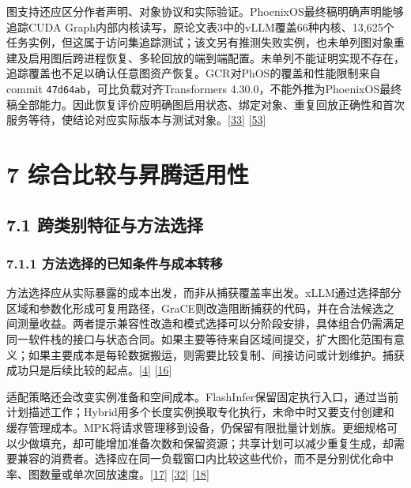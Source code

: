 \documentclass[
  11pt,
  UTF8]{ctexart}
\begin{document}
图支持还应区分作者声明、对象协议和实际验证。PhoenixOS最终稿明确声明能够追踪CUDA
Graph内部内核读写，原论文表3中的vLLM覆盖66种内核、13,625个任务实例，但这属于访问集追踪测试；该文另有推测失败实例，也未单列图对象重建及启用图后跨进程恢复、多轮回放的端到端配置。未单列不能证明实现不存在，追踪覆盖也不足以确认任意图资产恢复。GCR对PhOS的覆盖和性能限制来自commit
\texttt{47d64ab}，可比负载对齐Transformers
4.30.0，不能外推为PhoenixOS最终稿全部能力。因此恢复评价应明确图启用状态、绑定对象、重复回放正确性和首次服务等待，使结论对应实际版本与测试对象。{[}\protect\hyperlink{ref-wei2025phoenixos}{33}{]}
{[}\protect\hyperlink{ref-zeng2026gcr}{53}{]}

\hypertarget{section-7}{%
\section{7 综合比较与昇腾适用性}\label{section-7}}

\hypertarget{section-7-1}{%
\subsection{7.1 跨类别特征与方法选择}\label{section-7-1}}

\hypertarget{section-7-1-1}{%
\subsubsection{7.1.1 方法选择的已知条件与成本转移}\label{section-7-1-1}}

方法选择应从实际暴露的成本出发，而非从捕获覆盖率出发。xLLM通过选择部分区域和参数化形成可复用路径，GraCE则改造阻断捕获的代码，并在合法候选之间测量收益。两者提示兼容性改造和模式选择可以分阶段安排，具体组合仍需满足同一软件栈的接口与状态合同。如果主要等待来自区域间提交，扩大图化范围有意义；如果主要成本是每轮数据搬运，则需要比较复制、间接访问或计划维护。捕获成功只是后续比较的起点。{[}\protect\hyperlink{ref-liu2025xllm}{4}{]}
{[}\protect\hyperlink{ref-ghosh2026grace}{16}{]}

适配策略还会改变实例准备和空间成本。FlashInfer保留固定执行入口，通过当前计划描述工作；Hybrid用多个长度实例换取专化执行，未命中时又要支付创建和缓存管理成本。MPK将请求管理移到设备，仍保留有限批量计划族。更细规格可以少做填充，却可能增加准备次数和保留资源；共享计划可以减少重复生成，却需要兼容的消费者。选择应在同一负载窗口内比较这些代价，而不是分别优化命中率、图数量或单次回放速度。{[}\protect\hyperlink{ref-ye2025flashinfer}{17}{]}
{[}\protect\hyperlink{ref-yadav2026hybridpreprint}{32}{]}
{[}\protect\hyperlink{ref-cheng2026mpk}{18}{]}
\end{document}
